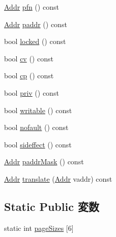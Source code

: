 \begin{DoxyCompactItemize}
\hyperlink{base_2types_8hh_af1bb03d6a4ee096394a6749f0a169232}{Addr} \hyperlink{classSparcISA_1_1PageTableEntry_ae6bfcb957f6df6777f3294e78ac298af}{pfn} () const 
\item 
\hyperlink{base_2types_8hh_af1bb03d6a4ee096394a6749f0a169232}{Addr} \hyperlink{classSparcISA_1_1PageTableEntry_a26f24be1556c1c0ac2c42e1eff5e1197}{paddr} () const 
\item 
bool \hyperlink{classSparcISA_1_1PageTableEntry_a278ee3d69582e50938dd6a879098bb4b}{locked} () const 
\item 
bool \hyperlink{classSparcISA_1_1PageTableEntry_a92853352805a625ea371d16aa99235e3}{cv} () const 
\item 
bool \hyperlink{classSparcISA_1_1PageTableEntry_aa54ec88247ae312c0622dc2e402bb99b}{cp} () const 
\item 
bool \hyperlink{classSparcISA_1_1PageTableEntry_a77228daa47c7168c944bb120a22dba3f}{priv} () const 
\item 
bool \hyperlink{classSparcISA_1_1PageTableEntry_a3917cec378f7697f74d6600fb0f08878}{writable} () const 
\item 
bool \hyperlink{classSparcISA_1_1PageTableEntry_a14f36fe729c0af75b9da5b5027b4e571}{nofault} () const 
\item 
bool \hyperlink{classSparcISA_1_1PageTableEntry_a437c33eff5d1bf22303319d369fd5b78}{sideffect} () const 
\item 
\hyperlink{base_2types_8hh_af1bb03d6a4ee096394a6749f0a169232}{Addr} \hyperlink{classSparcISA_1_1PageTableEntry_a94d3e666f6695ace0b7398ebac2980cf}{paddrMask} () const 
\item 
\hyperlink{base_2types_8hh_af1bb03d6a4ee096394a6749f0a169232}{Addr} \hyperlink{classSparcISA_1_1PageTableEntry_a2d9d30526f3c6e7e6474010b7f73e590}{translate} (\hyperlink{base_2types_8hh_af1bb03d6a4ee096394a6749f0a169232}{Addr} vaddr) const 
\end{DoxyCompactItemize}
\subsection*{Static Public 変数}
\begin{DoxyCompactItemize}
\item 
static int \hyperlink{classSparcISA_1_1PageTableEntry_a3a85d8c453cc213556f3308e8dbdd6af}{pageSizes} \mbox{[}6\mbox{]}
\end{DoxyCompactItemize}
